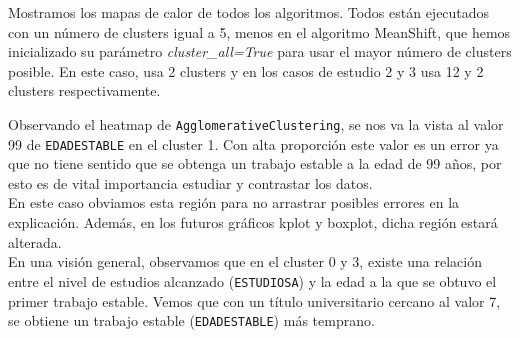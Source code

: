 	Mostramos los mapas de calor de todos los algoritmos. Todos están ejecutados con un número de clusters igual a 5, menos en el algoritmo MeanShift, que hemos inicializado su parámetro \textit{cluster\_all=True} para usar el mayor número de clusters posible. En este caso, usa 2 clusters y en los casos de estudio 2 y 3 usa 12 y 2 clusters respectivamente.
	
	\begin{figure}[H]
		\centering
		
	\end{figure}
	
	
	\begin{figure}[H]
		\centering
		
		
		
	\end{figure}


	\begin{figure}[H]
		\centering
		
	\end{figure}
	
	Observando el heatmap de \texttt{AgglomerativeClustering}, se nos va la vista al valor 99 de \texttt{EDADESTABLE} en el cluster 1. Con alta proporción este valor es un error ya que no tiene sentido que se obtenga un trabajo estable a la edad de 99 años, por esto es de vital importancia estudiar y contrastar los datos. \\
	En este caso obviamos esta región para no arrastrar posibles errores en la explicación. Además, en los futuros gráficos kplot y boxplot, dicha región estará alterada.\\
	
	En una visión general, observamos que en el cluster 0 y 3, existe una relación entre el nivel de estudios alcanzado (\texttt{ESTUDIOSA}) y la edad a la que se obtuvo el primer trabajo estable. Vemos que con un título universitario cercano al valor 7, se obtiene un trabajo estable (\texttt{EDADESTABLE}) más temprano. \\
	
